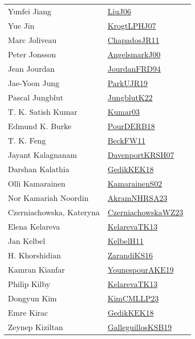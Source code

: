 {\begin{longtable}{p{4cm}p{20cm}}
Yunfei Jiang & \href{works/LiuJ06.pdf}{LiuJ06}~\cite{LiuJ06}\\
Yue Jin & \href{works/KrogtLPHJ07.pdf}{KrogtLPHJ07}~\cite{KrogtLPHJ07}\\
Marc Joliveau & \href{works/ChapadosJR11.pdf}{ChapadosJR11}~\cite{ChapadosJR11}\\
Peter Jonsson & \href{works/AngelsmarkJ00.pdf}{AngelsmarkJ00}~\cite{AngelsmarkJ00}\\
Jean Jourdan & \href{}{JourdanFRD94}~\cite{JourdanFRD94}\\
Jae{-}Yoon Jung & \href{works/ParkUJR19.pdf}{ParkUJR19}~\cite{ParkUJR19}\\
Pascal Jungblut & \href{}{JungblutK22}~\cite{JungblutK22}\\
T. K. Satish Kumar & \href{works/Kumar03.pdf}{Kumar03}~\cite{Kumar03}\\
Edmund K. Burke & \href{works/PourDERB18.pdf}{PourDERB18}~\cite{PourDERB18}\\
T. K. Feng & \href{}{BeckFW11}~\cite{BeckFW11}\\
Jayant Kalagnanam & \href{works/DavenportKRSH07.pdf}{DavenportKRSH07}~\cite{DavenportKRSH07}\\
Darshan Kalathia & \href{works/GedikKEK18.pdf}{GedikKEK18}~\cite{GedikKEK18}\\
Olli Kamarainen & \href{works/KamarainenS02.pdf}{KamarainenS02}~\cite{KamarainenS02}\\
Nor Kamariah Noordin & \href{works/AkramNHRSA23.pdf}{AkramNHRSA23}~\cite{AkramNHRSA23}\\
Czerniachowska, Kateryna & \href{works/CzerniachowskaWZ23.pdf}{CzerniachowskaWZ23}~\cite{CzerniachowskaWZ23}\\
Elena Kelareva & \href{works/KelarevaTK13.pdf}{KelarevaTK13}~\cite{KelarevaTK13}\\
Jan Kelbel & \href{works/KelbelH11.pdf}{KelbelH11}~\cite{KelbelH11}\\
H. Khorshidian & \href{works/ZarandiKS16.pdf}{ZarandiKS16}~\cite{ZarandiKS16}\\
Kamran Kianfar & \href{}{YounespourAKE19}~\cite{YounespourAKE19}\\
Philip Kilby & \href{works/KelarevaTK13.pdf}{KelarevaTK13}~\cite{KelarevaTK13}\\
Dongyun Kim & \href{works/KimCMLLP23.pdf}{KimCMLLP23}~\cite{KimCMLLP23}\\
Emre Kirac & \href{works/GedikKEK18.pdf}{GedikKEK18}~\cite{GedikKEK18}\\
Zeynep Kiziltan & \href{works/GalleguillosKSB19.pdf}{GalleguillosKSB19}~\cite{GalleguillosKSB19}\\

\end{longtable}}
